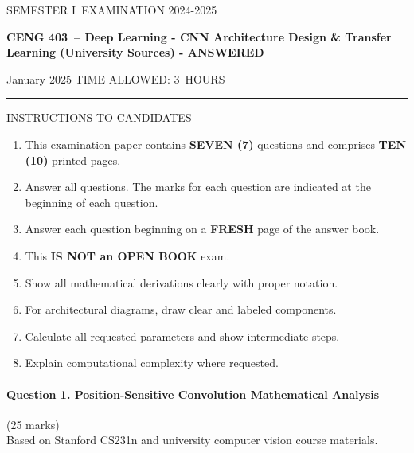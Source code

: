 \documentclass[12pt]{article}
\newcommand{\masunitnumber}{CENG 403}
\newcommand{\examdate}{January 2025}
\newcommand{\academicyear}{2024-2025}
\newcommand{\semester}{I}
\newcommand{\coursename}{Deep Learning - CNN Architecture Design \& Transfer Learning (University Sources) - ANSWERED}
\newcommand{\numberofhours}{3}
\begin{document}
\setlength{\headsep}{5truemm}
\setlength{\headheight}{14.5truemm}
\setlength{\voffset}{-0.45truein}
\renewcommand{\headrulewidth}{0.0pt}
\begin{center}
SEMESTER \semester\ EXAMINATION \academicyear
\end{center}
\begin{center}
{\bf \masunitnumber\ -- \coursename}
\end{center}
\vspace{20truemm}
\noindent \examdate\hspace{45truemm} TIME ALLOWED: \numberofhours\ HOURS
\vspace{19truemm}
\hrule
\vspace{19truemm}
\noindent\underline{INSTRUCTIONS TO CANDIDATES}
\vspace{8truemm}
\begin{enumerate}
\item This examination paper contains {\bf SEVEN (7)} questions and comprises 
{\bf TEN (10)} printed pages.
\item Answer all questions. 
The marks for each question are indicated at the beginning of each question.
\item Answer each question beginning on a {\bf FRESH} page of the answer book.
\item This {\bf IS NOT an OPEN BOOK} exam.
\item Show all mathematical derivations clearly with proper notation.
\item For architectural diagrams, draw clear and labeled components.
\item Calculate all requested parameters and show intermediate steps.
\item Explain computational complexity where requested.
\end{enumerate}
\newpage
\lhead{}
\rhead{\masunitnumber}
\chead{}
\lfoot{}
\cfoot{\thepage}
\rfoot{}
\setlength{\footskip}{45pt}

\paragraph{Question 1. Position-Sensitive Convolution Mathematical Analysis}{{\hfill (25 marks)}}\\
Based on Stanford CS231n and university computer vision course materials.
\end{document}
